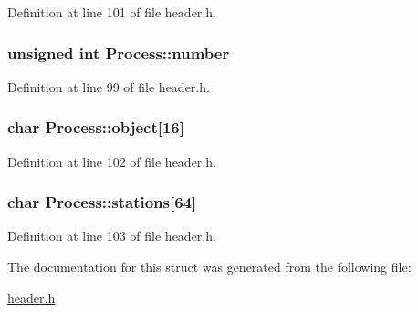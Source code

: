 Definition at line 101 of file header.h.\hypertarget{structProcess_a0505f4284097ad8aabf18926a5578c9f}{
\subsubsection[{number}]{\setlength{\rightskip}{0pt plus 5cm}unsigned int {\bf Process::number}}}
\label{structProcess_a0505f4284097ad8aabf18926a5578c9f}


Definition at line 99 of file header.h.\hypertarget{structProcess_acbb3edd0ee2d297e6203318be0b55de7}{
\subsubsection[{object}]{\setlength{\rightskip}{0pt plus 5cm}char {\bf Process::object}\mbox{[}16\mbox{]}}}
\label{structProcess_acbb3edd0ee2d297e6203318be0b55de7}


Definition at line 102 of file header.h.\hypertarget{structProcess_ac1ecae0ac385fb0eb5ec2a30a416ad2c}{
\subsubsection[{stations}]{\setlength{\rightskip}{0pt plus 5cm}char {\bf Process::stations}\mbox{[}64\mbox{]}}}
\label{structProcess_ac1ecae0ac385fb0eb5ec2a30a416ad2c}


Definition at line 103 of file header.h.

The documentation for this struct was generated from the following file:\begin{DoxyCompactItemize}
\item 
\hyperlink{header_8h}{header.h}\end{DoxyCompactItemize}
